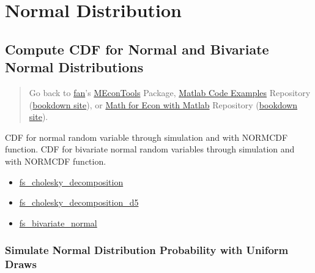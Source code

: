 \documentclass[
]{book}
\begin{document}
\hypertarget{normal-distribution}{%
\section{Normal Distribution}\label{normal-distribution}}

\hypertarget{compute-cdf-for-normal-and-bivariate-normal-distributions}{%
\subsection{Compute CDF for Normal and Bivariate Normal Distributions}\label{compute-cdf-for-normal-and-bivariate-normal-distributions}}

\begin{quote}
Go back to \href{http://fanwangecon.github.io/}{fan}'s \href{https://fanwangecon.github.io/MEconTools/}{MEconTools} Package, \href{https://fanwangecon.github.io/M4Econ/}{Matlab Code Examples} Repository (\href{https://fanwangecon.github.io/M4Econ/bookdown}{bookdown site}), or \href{https://fanwangecon.github.io/Math4Econ/}{Math for Econ with Matlab} Repository (\href{https://fanwangecon.github.io/Math4Econ/bookdown}{bookdown site}).
\end{quote}

CDF for normal random variable through simulation and with NORMCDF
function. CDF for bivariate normal random variables through simulation
and with NORMCDF function.

\begin{itemize}
\item
  \href{https://fanwangecon.github.io/M4Econ/simulation/normal/htmlpdfm/fs_cholesky_decomposition.html}{fs\_cholesky\_decomposition}
\item
  \href{https://fanwangecon.github.io/M4Econ/simulation/normal/htmlpdfm/fs_cholesky_decomposition_d5.html}{fs\_cholesky\_decomposition\_d5}
\item
  \href{https://fanwangecon.github.io/M4Econ/simulation/normal/htmlpdfm/fs_bivariate_normal.html}{fs\_bivariate\_normal}
\end{itemize}

\hypertarget{simulate-normal-distribution-probability-with-uniform-draws}{%
\subsubsection{Simulate Normal Distribution Probability with Uniform Draws}\label{simulate-normal-distribution-probability-with-uniform-draws}}
\end{document}
